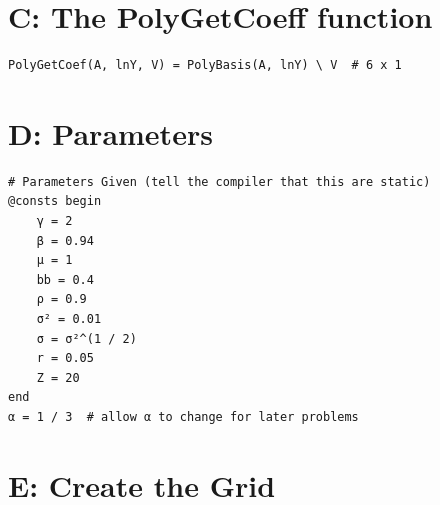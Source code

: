 \documentclass[12pt]{article}
\begin{document}
\newpage
\section*{C: The PolyGetCoeff function}

\begin{lstlisting}[language=JuliaLocal, style=julia]
PolyGetCoef(A, lnY, V) = PolyBasis(A, lnY) \ V  # 6 x 1
\end{lstlisting}











\newpage
\section*{D: Parameters}

\begin{lstlisting}[language=JuliaLocal, style=julia]
# Parameters Given (tell the compiler that this are static)
@consts begin
    γ = 2
    β = 0.94
    μ = 1
    bb = 0.4
    ρ = 0.9
    σ² = 0.01
    σ = σ²^(1 / 2)
    r = 0.05
    Z = 20
end
α = 1 / 3  # allow α to change for later problems
\end{lstlisting}











\newpage
\section*{E: Create the Grid}
\end{document}
